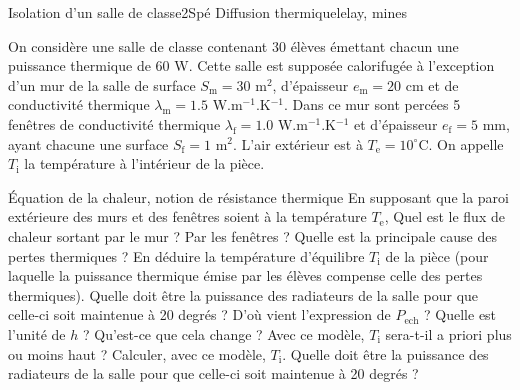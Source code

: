 \begin{exercise}{Isolation d'un salle de classe}{2}{Spé}
{Diffusion thermique}{lelay, mines}

On considère une salle de classe contenant $30$ élèves émettant chacun une puissance thermique de $60$ W. Cette salle est supposée calorifugée à l'exception d'un mur de la salle de surface $S_\text{m} = 30$ m$^2$, d'épaisseur $e_\text{m} = 20$ cm et de conductivité thermique $\lambda_\text{m} = 1.5$ W.m$^{-1}$.K$^{-1}$. Dans ce mur sont percées 5 fenêtres de conductivité thermique $\lambda_\text{f} = 1.0$ W.m$^{-1}$.K$^{-1}$ et d'épaisseur $e_\text{f} = 5$ mm, ayant chacune une surface $S_\text{f} = 1$ m$^2$. L'air extérieur est à $T_\text{e} = 10^\circ$C. On appelle $T_\text{i}$ la température à l'intérieur de la pièce.

\begin{questions}
    \questioncours Équation de la chaleur, notion de résistance thermique
    \question En supposant que la paroi extérieure des murs et des fenêtres soient à la température $T_\text{e}$, Quel est le flux de chaleur sortant par le mur ? Par les fenêtres ? Quelle est la principale cause des pertes thermiques ?
    \question En déduire la température d'équilibre $T_\text{i}$ de la pièce (pour laquelle la puissance thermique émise par les élèves compense celle des pertes thermiques).
    \question Quelle doit être la puissance des radiateurs de la salle pour que celle-ci soit maintenue à 20 degrés ?
    \question D'où vient l'expression de $P_\text{ech}$ ? Quelle est l'unité de $h$ ?
    \question Qu'est-ce que cela change ? Avec ce modèle, $T_\text{i}$ sera-t-il a priori plus ou moins haut ?
    \question Calculer, avec ce modèle, $T_\text{i}$.
    \question Quelle doit être la puissance des radiateurs de la salle pour que celle-ci soit maintenue à 20 degrés ?
\end{questions}

\end{exercise}

